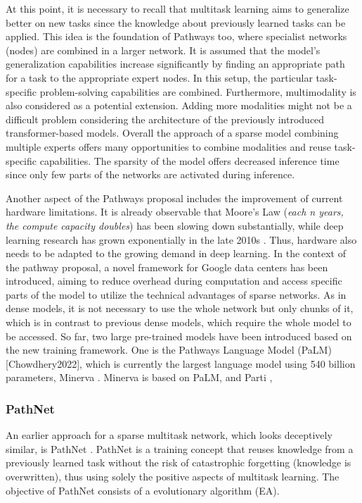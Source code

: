 \documentclass[
]{krantz}
\begin{document}
At this point, it is necessary to recall that multitask learning aims to generalize better on new tasks since the knowledge about previously learned tasks can be applied. This idea is the
foundation of Pathways too, where specialist networks (nodes) are combined in a larger network. It is assumed that the model's generalization capabilities increase significantly by finding
an appropriate path for a task to the appropriate expert nodes. In this setup, the particular task-specific problem-solving capabilities are combined. Furthermore, multimodality is also
considered as a potential extension. Adding more modalities might not be a difficult problem considering the architecture of the previously introduced transformer-based models.
Overall the approach of a sparse model combining multiple experts offers many opportunities to combine modalities and reuse task-specific capabilities. The sparsity of the model offers
decreased inference time since only few parts of the networks are activated during inference.

Another aspect of the Pathways proposal includes the improvement of current hardware limitations. It is already observable that Moore's Law (\emph{each n years, the compute capacity doubles}) has
been slowing down substantially, while deep learning research has grown exponentially in the late 2010s \citep{Dean20}. Thus, hardware also needs to be adapted to the growing demand in deep learning.
In the context of the pathway proposal, a novel framework for Google data centers has been introduced, aiming to reduce overhead during computation and access specific parts of the model to
utilize the technical advantages of sparse networks. As in dense models, it is not necessary to use the whole network but only chunks of it, which is in contrast to previous dense models, which
require the whole model to be accessed. So far, two large pre-trained models have been introduced based on the new training framework. One is the Pathways Language Model (PaLM) {[}Chowdhery2022{]},
which is currently the largest language model using 540 billion parameters, Minerva \citep{Lewkowycz2022}. Minerva is based on PaLM, and Parti \citep{parti},

\hypertarget{pathnet}{%
\subsubsection{PathNet}\label{pathnet}}

An earlier approach for a sparse multitask network, which looks deceptively similar, is PathNet \citep{Fernando2017}. PathNet is a training concept that reuses knowledge from a previously learned
task without the risk of catastrophic forgetting (knowledge is overwritten), thus using solely the positive aspects of multitask learning. The objective of PathNet consists of a evolutionary
algorithm (EA).
\end{document}
